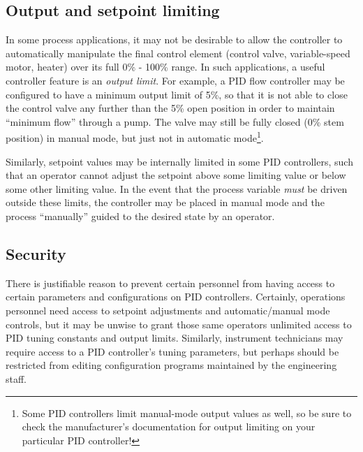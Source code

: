 








\filbreak
\subsection{Output and setpoint limiting}

In some process applications, it may not be desirable to allow the controller to automatically manipulate the final control element (control valve, variable-speed motor, heater) over its full 0\% - 100\% range.  In such applications, a useful controller feature is an \textit{output limit}.  For example, a PID flow controller may be configured to have a minimum output limit of 5\%, so that it is not able to close the control valve any further than the 5\% open position in order to maintain ``minimum flow'' through a pump.  The valve may still be fully closed (0\% stem position) in manual mode, but just not in automatic mode\footnote{Some PID controllers limit manual-mode output values as well, so be sure to check the manufacturer's documentation for output limiting on your particular PID controller!}.  

Similarly, setpoint values may be internally limited in some PID controllers, such that an operator cannot adjust the setpoint above some limiting value or below some other limiting value.  In the event that the process variable \textit{must} be driven outside these limits, the controller may be placed in manual mode and the process ``manually'' guided to the desired state by an operator.









\filbreak
\subsection{Security}

There is justifiable reason to prevent certain personnel from having access to certain parameters and configurations on PID controllers.  Certainly, operations personnel need access to setpoint adjustments and automatic/manual mode controls, but it may be unwise to grant those same operators unlimited access to PID tuning constants and output limits.  Similarly, instrument technicians may require access to a PID controller's tuning parameters, but perhaps should be restricted from editing configuration programs maintained by the engineering staff.

